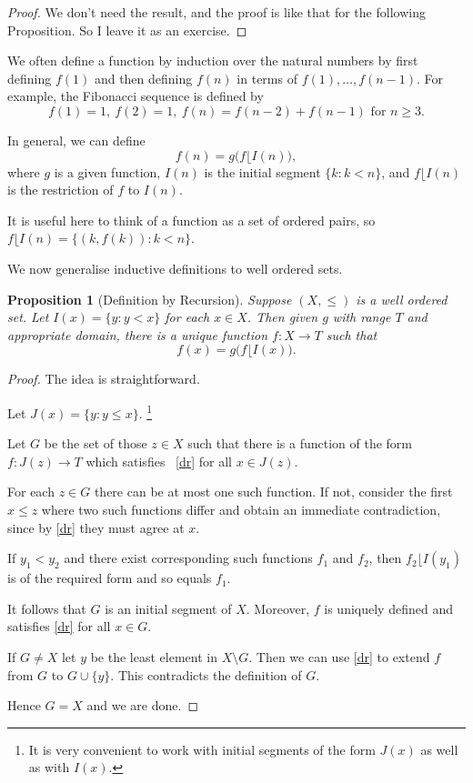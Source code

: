 \documentclass[a4paper]{amsart}
\theoremstyle{plain}
\newtheorem{proposition}[theorem]{Proposition}
\theoremstyle{definition}
\theoremstyle{remark}
\begin{document}
 \begin{proof}
We don't need the result, and the proof is like that for the following Proposition.  So I leave it as an exercise.
  \end{proof} 
 
 
We often define a function by induction over the natural numbers by first defining $ f(1) $ and then defining $ f(n) $ in terms of $ f(1),\dots, f(n-1) $.  For example, the Fibonacci sequence is defined by
\[  
f(1)=1, \ f(2) =1, \ f(n) = f(n-2) + f(n-1) \text{ for } n \geq 3.
\]

In  general, we can define 
\[
f(n) = g \big(f \lfloor I(n)\big),
\]
where $ g $ is a given function, $ I(n)$ is the initial segment $   \{k : k < n \} $, and $ f \lfloor I(n) $ is the restriction of $ f $ to $ I(n) $. 

It is useful here to think of a function as a set of ordered pairs, so   $f \lfloor I(n) = \{ (k,f(k)) : k < n\} $.
 
 \medskip We now generalise inductive definitions to well ordered sets.
  
\begin{proposition}[Definition by Recursion] \label{dfrec} Suppose $ (X, \leqslant ) $ is a well ordered set.  Let $ I(x) = \{ y : y < x \} $ for each $ x \in X $.  Then given $ g $ with range $ T $ and appropriate domain, there is a unique function $ f :X\to T $ such that 
\begin{equation} \label{dr} 
 f(x) = g \big(f \lfloor I(x)\big).
\end{equation} 
\end{proposition} 

\begin{proof} The idea is straightforward.  

Let $ J(x) = \{ y : y  \leqslant x \} $.%
\footnote{It is very convenient  to work with initial segments of the form $J(x) $  as well as with $ I(x) $.}

Let $ G $ be the set of those $ z \in X $ such that there is   a function  of the form $ f:J(z) \to T $   which satisfies 
~\eqref{dr} for all $ x \in J(z) $.

For each $ z\in G $ there can be at most one such function.  If not, consider the first $ x \leqslant z $ where two such functions differ and obtain an immediate contradiction, since by  \eqref{dr}  they must agree at $ x $.

If $ y_1 < y_2 $ and there exist corresponding such functions $ f_1  $ and $ f_2 $, then $f_2 \lfloor I(y_1)$ is of the required form and so equals $ f_1 $. 

 It follows that $ G $ is an initial segment of $ X $.  Moreover, $ f $ is uniquely defined 
 and satisfies \eqref{dr} for all $ x \in G $.

If $ G \neq X $ let $ y $ be the least element in $ X \setminus G $.  Then we can use \eqref{dr} to extend   
$ f $ from $ G $ to $ G \cup\{y\} $. This contradicts the definition of $ G $.

Hence $ G=X  $ and we are done.
\end{proof} 
\end{document}

